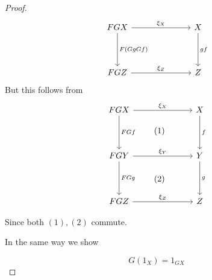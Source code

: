 \documentclass{article}
\begin{document}
\begin{proof}
        \[
            \begin{tikzcd}[column sep=7em, row sep=4em]
                FGX \arrow[r,  "\xi_X"] \arrow[d, "F(Gg Gf)"]
                & X \arrow[d, "gf"] \\
                FGZ \arrow[r, "\xi_Z"]
                & Z
            \end{tikzcd}
        \]
        But this follows from
        \[
            \begin{tikzcd}[column sep=7em, row sep=4em]
                FGX \arrow[r, "\xi_X"] \arrow[d, "FGf"]
                & X \arrow[d, "f"] \\
                FGY \arrow[r, "\xi_Y"] \arrow[d, "FGg"]
                & Y \arrow[d, "g"] \\
                FGZ \arrow[r, "\xi_Z"]
                & Z
            \end{tikzcd}
            \begin{tikzpicture}[overlay]
                \node at (-2, 1) {(1)};
                \node at (-2, -1) {(2)};

            \end{tikzpicture}
        \]

        Since both \((1), (2)\) commute.

        In the same way we show

        \[
            G(1_X) = 1_{GX}
        \]
    \end{proof}
\end{document}
